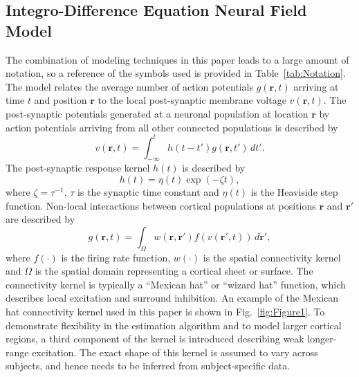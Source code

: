 \documentclass[5p,authoryear]{elsarticle}
\begin{document}
\subsection{Integro-Difference Equation Neural Field Model}\label{IntegroDifferenceEquationSection} 
The combination of modeling techniques in this paper leads to a large amount of notation, so a reference of the symbols used is provided in Table~\ref{tab:Notation}. The model relates the average number of action potentials $g(\mathbf{r},t)$ arriving at time $t$ and position $\mathbf{r}$ to the local post-synaptic membrane voltage $v(\mathbf{r},t)$. The post-synaptic potentials generated at a neuronal population at location $\mathbf{r}$ by action potentials arriving from all other connected populations is described by 
\begin{equation}
	\label{SpikesToPotential} v\left( {\mathbf{r},t} \right) = \int_{ - \infty }^t {h\left( {t - t'} \right)g\left( {\mathbf{r},t'} \right) \, dt'}. 
\end{equation}
The post-synaptic response kernel $h(t)$ is described by 
\begin{equation}
	\label{SynapticRespKernel} h(t) = \eta(t)\exp{\left(-\zeta t\right)}, 
\end{equation}
where $\zeta=\tau^{-1}$, $\tau$ is the synaptic time constant and $\eta(t)$ is the Heaviside step function. Non-local interactions between cortical populations at positions $\mathbf{r}$ and $\mathbf{r}'$ are described by 
\begin{equation}
	\label{RateBasedInteractions} g\left( \mathbf{r},t \right) = \int_\Omega {w\left( \mathbf{r},\mathbf{r}' \right)f\left( v\left( \mathbf{r}',t \right) \right)\, d\mathbf{r}'}, 
\end{equation}
where $f(\cdot)$ is the firing rate function, $w(\cdot)$ is the spatial connectivity kernel and $\Omega$ is the spatial domain representing a cortical sheet or surface. The connectivity kernel is typically a ``Mexican hat'' or ``wizard hat'' function, which describes local excitation and surround inhibition. An example of the Mexican hat connectivity kernel used in this paper is shown in Fig.~\ref{fig:Figure1}. To demonstrate flexibility in the estimation algorithm and to model larger cortical regions, a third component of the kernel is introduced describing weak longer-range excitation. The exact shape of this kernel is assumed to vary across subjects, and hence needs to be inferred from subject-specific data.
\end{document}
